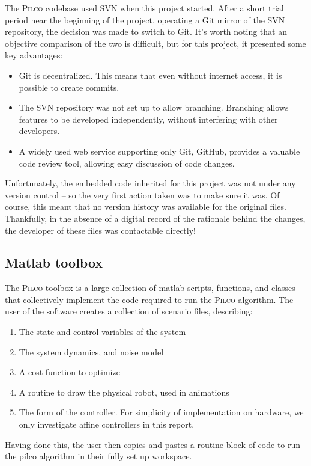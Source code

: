 \documentclass[main.tex]{subfiles}
\begin{document}
	The \textsc{Pilco} codebase used SVN when this project started. After a short trial period near the beginning of the project, operating a Git mirror of the SVN repository, the decision was made to switch to Git. It's worth noting that an objective comparison of the two is difficult, but for this project, it presented some key advantages:
	\begin{itemize}
		\item
			Git is decentralized. This means that even without internet access, it is possible to create commits.

		\item
			The SVN repository was not set up to allow branching. Branching allows features to be developed independently, without interfering with other developers.

		\item
			A widely used web service supporting only Git, GitHub, provides a valuable code review tool, allowing easy discussion of code changes.
	\end{itemize}

	Unfortunately, the embedded code inherited for this project was not under any version control -- so the very first action taken was to make sure it was.
	Of course, this meant that no version history was available for the original files. Thankfully, in the absence of a digital record of the rationale behind the changes, the developer of these files was contactable directly!

	\subsection{Matlab toolbox}

	The \textsc{Pilco} toolbox is a large collection of matlab scripts, functions, and classes that collectively implement the code required to run the \textsc{Pilco} algorithm. The user of the software creates a collection of scenario files, describing:
	\begin{enumerate}[noitemsep]
		\item The state and control variables of the system
		\item The system dynamics, and noise model
		\item A cost function to optimize
		\item A routine to draw the physical robot, used in animations
		\item The form of the controller. For simplicity of implementation on hardware, we only investigate affine controllers in this report.
	\end{enumerate}
	Having done this, the user then copies and pastes a routine block of code to run the pilco algorithm in their fully set up workspace.
\end{document}

